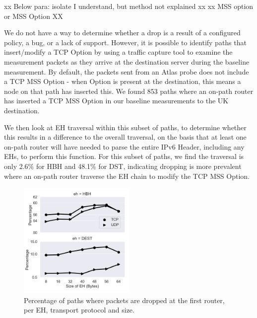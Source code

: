 \documentclass[conference]{IEEEtran}
\begin{document}
xx Below para: isolate I understand, but method not explained xx
xx MSS option or MSS Option XX

We do not have a way to determine whether a drop is a result of a configured policy, a bug, or a lack of support. 
However, it is possible to identify paths that insert/modify a TCP Option by using a traffic capture tool to examine the measurement packets as they arrive at the destination server during the baseline measurement. By default, the packets sent from an Atlas probe does not include a TCP MSS Option - when Option is present at the destination, this means a node on that path has inserted this. We found 853 paths where an on-path router has inserted a TCP MSS Option in our baseline measurements to the UK destination. 

We then look at EH traversal within this subset of paths, to determine whether this results in a difference to the overall traversal, on the basis that at least one on-path router will have needed to parse the entire IPv6 Header, including any EHs, to perform this function.
For this subset of paths, we find the traversal is only 2.6\% for HBH and 48.1\% for DST, indicating dropping is more prevalent where an on-path router traverse the EH chain to modify the TCP MSS Option.


\begin{figure}
\centering
  \includegraphics[width=0.5\textwidth]{empty_paths.png}
  \caption{Percentage of paths where packets are dropped at the first router, per EH, transport protocol and size.}
  \label{fig:empty_paths}
\end{figure}
\end{document}
